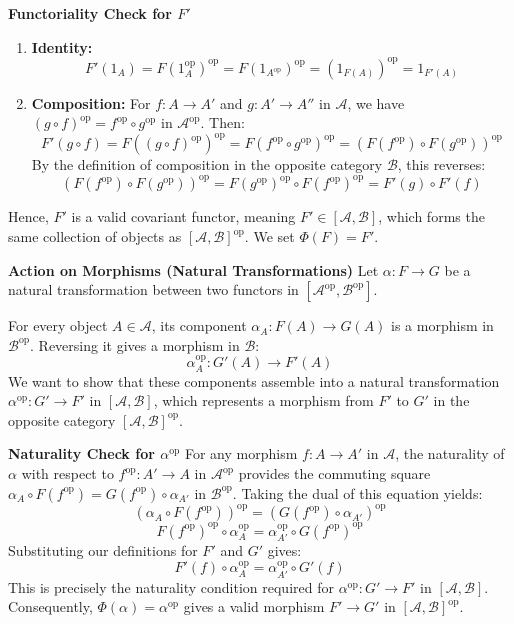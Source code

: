 \documentclass{article}
\begin{document}
\textbf{Functoriality Check for $F'$}
\begin{enumerate}
    \item \textbf{Identity:} 
    \[ F'(1_A) = F(1_A^\text{op})^\text{op} = F(1_{A^\text{op}})^\text{op} = (1_{F(A)})^\text{op} = 1_{F'(A)} \]
    
    \item \textbf{Composition:} For $f: A \to A'$ and $g: A' \to A''$ in $\mathcal{A}$, we have $(g \circ f)^\text{op} = f^\text{op} \circ g^\text{op}$ in $\mathcal{A}^\text{op}$. Then:
    \[ F'(g \circ f) = F((g \circ f)^\text{op})^\text{op} = F(f^\text{op} \circ g^\text{op})^\text{op} = (F(f^\text{op}) \circ F(g^\text{op}))^\text{op} \]
    By the definition of composition in the opposite category $\mathcal{B}$, this reverses:
    \[ (F(f^\text{op}) \circ F(g^\text{op}))^\text{op} = F(g^\text{op})^\text{op} \circ F(f^\text{op})^\text{op} = F'(g) \circ F'(f) \]
\end{enumerate}
Hence, $F'$ is a valid covariant functor, meaning $F' \in [\mathcal{A}, \mathcal{B}]$, which forms the same collection of objects as $[\mathcal{A}, \mathcal{B}]^\text{op}$. We set $\Phi(F) = F'$.

\textbf{Action on Morphisms (Natural Transformations)}
Let $\alpha: F \to G$ be a natural transformation between two functors in $[\mathcal{A}^\text{op}, \mathcal{B}^\text{op}]$. 

For every object $A \in \mathcal{A}$, its component $\alpha_A: F(A) \to G(A)$ is a morphism in $\mathcal{B}^\text{op}$. Reversing it gives a morphism in $\mathcal{B}$:
\[ \alpha_A^\text{op}: G'(A) \to F'(A) \]
We want to show that these components assemble into a natural transformation $\alpha^\text{op}: G' \to F'$ in $[\mathcal{A}, \mathcal{B}]$, which represents a morphism from $F'$ to $G'$ in the opposite category $[\mathcal{A}, \mathcal{B}]^\text{op}$.

\textbf{Naturality Check for $\alpha^\text{op}$}
For any morphism $f: A \to A'$ in $\mathcal{A}$, the naturality of $\alpha$ with respect to $f^\text{op}: A' \to A$ in $\mathcal{A}^\text{op}$ provides the commuting square $\alpha_A \circ F(f^\text{op}) = G(f^\text{op}) \circ \alpha_{A'}$ in $\mathcal{B}^\text{op}$. Taking the dual of this equation yields:
\[ (\alpha_A \circ F(f^\text{op}))^\text{op} = (G(f^\text{op}) \circ \alpha_{A'})^\text{op} \]
\[ F(f^\text{op})^\text{op} \circ \alpha_A^\text{op} = \alpha_{A'}^\text{op} \circ G(f^\text{op})^\text{op} \]
Substituting our definitions for $F'$ and $G'$ gives:
\[ F'(f) \circ \alpha_A^\text{op} = \alpha_{A'}^\text{op} \circ G'(f) \]
This is precisely the naturality condition required for $\alpha^\text{op}: G' \to F'$ in $[\mathcal{A}, \mathcal{B}]$. Consequently, $\Phi(\alpha) = \alpha^\text{op}$ gives a valid morphism $F' \to G'$ in $[\mathcal{A}, \mathcal{B}]^\text{op}$.
\end{document}
